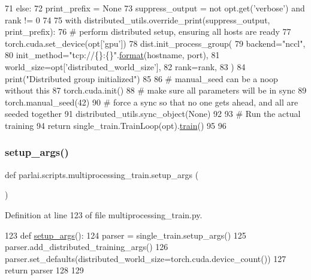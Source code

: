 \begin{DoxyCode}
71     \textcolor{keywordflow}{else}:
72         print\_prefix = \textcolor{keywordtype}{None}
73     suppress\_output = \textcolor{keywordflow}{not} opt.get(\textcolor{stringliteral}{'verbose'}) \textcolor{keywordflow}{and} rank != 0
74 
75     with distributed\_utils.override\_print(suppress\_output, print\_prefix):
76         \textcolor{comment}{# perform distributed setup, ensuring all hosts are ready}
77         torch.cuda.set\_device(opt[\textcolor{stringliteral}{'gpu'}])
78         dist.init\_process\_group(
79             backend=\textcolor{stringliteral}{"nccl"},
80             init\_method=\textcolor{stringliteral}{"tcp://\{\}:\{\}"}.\hyperlink{namespaceparlai_1_1chat__service_1_1services_1_1messenger_1_1shared__utils_a32e2e2022b824fbaf80c747160b52a76}{format}(hostname, port),
81             world\_size=opt[\textcolor{stringliteral}{'distributed\_world\_size'}],
82             rank=rank,
83         )
84         print(\textcolor{stringliteral}{"Distributed group initialized"})
85 
86         \textcolor{comment}{# manual\_seed can be a noop without this}
87         torch.cuda.init()
88         \textcolor{comment}{# make sure all parameters will be in sync}
89         torch.manual\_seed(42)
90         \textcolor{comment}{# force a sync so that no one gets ahead, and all are seeded together}
91         distributed\_utils.sync\_object(\textcolor{keywordtype}{None})
92 
93         \textcolor{comment}{# Run the actual training}
94         \textcolor{keywordflow}{return} single\_train.TrainLoop(opt).\hyperlink{namespaceprojects_1_1mastering__the__dungeon_1_1mturk_1_1tasks_1_1MTD_1_1run_a36a5f4f6f9df0611a6818610518d2cf0}{train}()
95 
96 
\end{DoxyCode}
\mbox{\label{namespaceparlai_1_1scripts_1_1multiprocessing__train_a1ee26bddeb470040cfbceb5ee7a9fa08}} 
\subsubsection{\texorpdfstring{setup\+\_\+args()}{setup\_args()}}
{\footnotesize\ttfamily def parlai.\+scripts.\+multiprocessing\+\_\+train.\+setup\+\_\+args (\begin{DoxyParamCaption}{ }\end{DoxyParamCaption})}



Definition at line 123 of file multiprocessing\+\_\+train.\+py.


\begin{DoxyCode}
123 \textcolor{keyword}{def }\hyperlink{namespaceparlai_1_1scripts_1_1multiprocessing__train_a1ee26bddeb470040cfbceb5ee7a9fa08}{setup\_args}():
124     parser = single\_train.setup\_args()
125     parser.add\_distributed\_training\_args()
126     parser.set\_defaults(distributed\_world\_size=torch.cuda.device\_count())
127     \textcolor{keywordflow}{return} parser
128 
129 
\end{DoxyCode}
